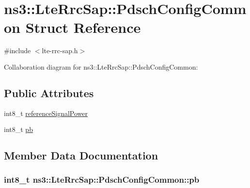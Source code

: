 \hypertarget{structns3_1_1LteRrcSap_1_1PdschConfigCommon}{}\section{ns3\+:\+:Lte\+Rrc\+Sap\+:\+:Pdsch\+Config\+Common Struct Reference}
\label{structns3_1_1LteRrcSap_1_1PdschConfigCommon}


{\ttfamily \#include $<$lte-\/rrc-\/sap.\+h$>$}



Collaboration diagram for ns3\+:\+:Lte\+Rrc\+Sap\+:\+:Pdsch\+Config\+Common\+:
\subsection*{Public Attributes}
\begin{DoxyCompactItemize}
\item 
int8\+\_\+t \hyperlink{structns3_1_1LteRrcSap_1_1PdschConfigCommon_a605d0faa2d58cb0e7c27aa84cd455c39}{reference\+Signal\+Power}
\item 
int8\+\_\+t \hyperlink{structns3_1_1LteRrcSap_1_1PdschConfigCommon_ab8e655503d77cadfc0d86a34c6d299ec}{pb}
\end{DoxyCompactItemize}


\subsection{Member Data Documentation}
\subsubsection[{\texorpdfstring{pb}{pb}}]{\setlength{\rightskip}{0pt plus 5cm}int8\+\_\+t ns3\+::\+Lte\+Rrc\+Sap\+::\+Pdsch\+Config\+Common\+::pb}\hypertarget{structns3_1_1LteRrcSap_1_1PdschConfigCommon_ab8e655503d77cadfc0d86a34c6d299ec}{}\label{structns3_1_1LteRrcSap_1_1PdschConfigCommon_ab8e655503d77cadfc0d86a34c6d299ec}

